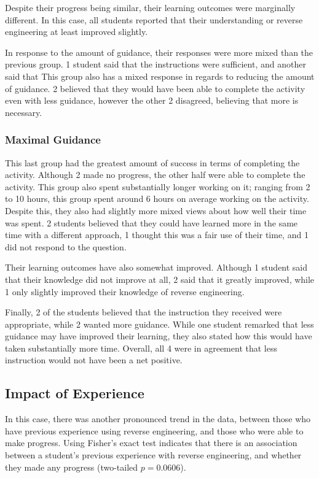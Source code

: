             Despite their progress being similar, their learning outcomes were marginally different. %
In this case, all students reported that their understanding or reverse engineering at least improved slightly. 

            In response to the amount of guidance, their responses were more mixed than the previous group. %
1 student said that the instructions were sufficient, and another said that  This group also has a mixed response in regards to reducing the amount of guidance. %
2 believed that they would have been able to complete the activity even with less guidance, however the other 2 disagreed, believing that more is necessary. 

        \subsubsection*{Maximal Guidance}
            This last group had the greatest amount of success in terms of completing the activity. %
Although 2 made no progress, the other half were able to complete the activity. %
This group also spent substantially longer working on it; %
ranging from 2 to 10 hours, this group spent around 6 hours on average working on the activity. %
Despite this, they also had slightly more mixed views about how well their time was spent. %
2 students believed that they could have learned more in the same time with a different approach, 1 thought this was a fair use of their time, and 1 did not respond to the question. 

            Their learning outcomes have also somewhat improved. %
Although 1 student said that their knowledge did not improve at all, 2 said that it greatly improved, while 1 only slightly improved their knowledge of reverse engineering.

            Finally, 2 of the students believed that the instruction they received were appropriate, while 2 wanted more guidance. %
While one student remarked that less guidance may have improved their learning, they also stated how this would have taken substantially more time. %
Overall, all 4 were in agreement that less instruction would not have been a net positive. 

    \subsection{Impact of Experience}
        In this case, there was another pronounced trend in the data, between those who have previous experience using reverse engineering, and those who were able to make progress. %
Using Fisher's exact test indicates that there is an association between a student's previous experience with reverse engineering, and whether they made any progress (two-tailed $p=0.0606$). 
                